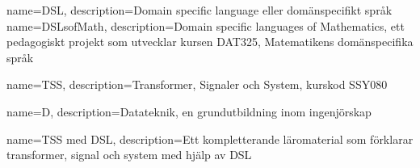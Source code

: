 {
    name=DSL,
    description={Domain specific language eller domänspecifikt språk}
}
{
    name=DSLsofMath,
    description={Domain specific languages of Mathematics, ett pedagogiskt projekt som utvecklar kursen DAT325, Matematikens domänspecifika språk}
}


{
    name=TSS,
    description={Transformer, Signaler och System, kurskod SSY080}
}


{
    name=D,
    description={Datateknik, en grundutbildning inom ingenjörskap}
}

{
    name={TSS med DSL},
    description={Ett kompletterande läromaterial som förklarar transformer, signal och system med hjälp av DSL}
}